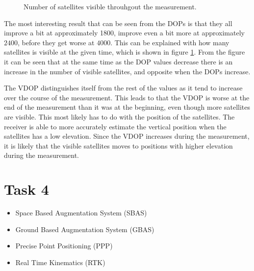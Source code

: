\documentclass{article}
\begin{document}
\begin{figure}[!ht]
    \centering
    \caption{Number of satellites visible throuhgout the measurement.}
    \label{fig:no_satellites}
\end{figure}

The most interesting result that can be seen from the DOPs is that they all improve a bit at approximately 1800, improve even a bit more at approximately $2400$, before they get worse at $4000$. This can be explained with how many satellites is visible at the given time, which is shown in figure \ref{fig:no_satellites}. From the figure it can be seen that at the same time as the DOP values decrease there is an increase in the number of visible satellites, and opposite when the DOPs increase.

The VDOP distinguishes itself from the rest of the values as it tend to increase over the course of the measurement. This leads to that the VDOP is worse at the end of the measurement than it was at the beginning, even though more satellites are visible. This most likely has to do with the position of the satellites. The receiver is able to more accurately estimate the vertical position when the satellites has a low elevation. Since the VDOP increases during the measurement, it is likely that the visible satellites moves to positions with higher elevation during the measurement.

\section*{Task 4}

\begin{itemize}
	\item Space Based Augmentation System (SBAS)
	\item Ground Based Augmentation System (GBAS)
	\item Precise Point Positioning (PPP)
	\item Real Time Kinematics (RTK)
\end{itemize}
\end{document}
